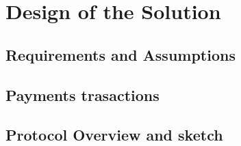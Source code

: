 \section{Design of the Solution}

\label{sec:design}


\subsection{Requirements and Assumptions }


\subsection{Payments trasactions}



\subsection{Protocol Overview and sketch}







